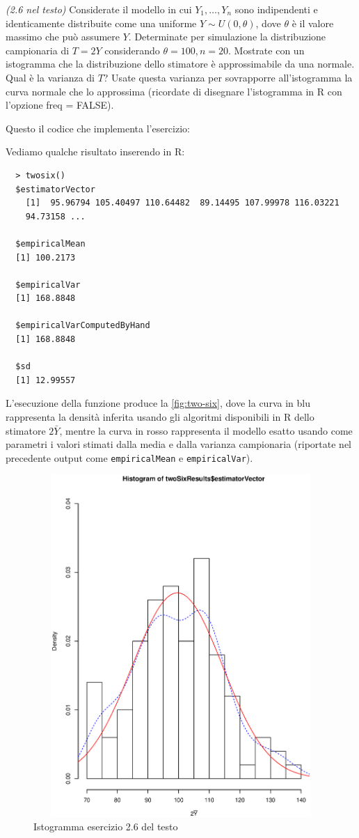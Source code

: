 
\begin{exercise}{\emph{(2.6 nel testo)}}
  Considerate il modello in cui $Y_1,\ldots, Y_n$ sono indipendenti e
  identicamente distribuite come una uniforme $Y \sim U(0, \theta)$,
  dove $\theta$ \`e il valore massimo che pu\`o assumere $Y$.
  Determinate per simulazione la distribuzione campionaria di $T = 2Y$
  considerando $\theta = 100, n = 20$. Mostrate con un istogramma che
  la distribuzione dello stimatore \`e approssimabile da una
  normale. Qual \`e la varianza di $T$? Usate questa varianza per
  sovrapporre all'istogramma la curva normale che lo approssima
  (ricordate di disegnare l'istogramma in R con l'opzione freq =
  FALSE).
\end{exercise}
Questo il codice che implementa l'esercizio:

Vediamo qualche risultato inserendo in R:
\begin{lstlisting}
  > twosix()
  $estimatorVector
    [1]  95.96794 105.40497 110.64482  89.14495 107.99978 116.03221
    94.73158 ...
  
  $empiricalMean
  [1] 100.2173

  $empiricalVar
  [1] 168.8848

  $empiricalVarComputedByHand
  [1] 168.8848

  $sd
  [1] 12.99557
\end{lstlisting}
L'esecuzione della funzione produce la \autoref{fig:two-six}, dove la
curva in blu rappresenta la densit\`a inferita usando gli algoritmi
disponibili in R dello stimatore $2\bar{Y}$, mentre la curva in rosso
rappresenta il modello esatto usando come parametri i valori stimati
dalla media e dalla varianza campionaria (riportate nel precedente
output come \texttt{empiricalMean} e \texttt{empiricalVar}).
\begin{figure}[htb]
\centering
\includegraphics[height=13cm,width=13cm]{r-sources/exercises/chapter-two/two-six.ps}
\caption{Istogramma esercizio 2.6 del testo}
\label{fig:two-six}
\end{figure}

